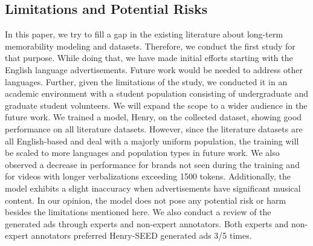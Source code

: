 \subsection{Limitations and Potential Risks}
In this paper, we try to fill a gap in the existing literature about long-term memorability modeling and datasets. Therefore, we conduct the first study for that purpose. While doing that, we have made initial efforts starting with the English language advertisements. Future work would be needed to address other languages. Further, given the limitations of the study, we conducted it in an academic environment with a student population consisting of undergraduate and graduate student volunteers. We will expand the scope to a wider audience in the future work. We trained a model, Henry, on the collected dataset, showing good performance on all literature datasets. However, since the literature datasets are all English-based and deal with a majorly uniform population, the training will be scaled to more languages and population types in future work. We also observed a decrease in performance for brands not seen during the training and for videos with longer verbalizations exceeding 1500 tokens. Additionally, the model exhibits a slight inaccuracy when advertisements have significant musical content. In our opinion, the model does not pose any potential risk or harm besides the limitations mentioned here. We also conduct a review of the generated ads through experts and non-expert annotators. Both experts and non-expert annotators preferred Henry-SEED generated ads 3/5 times.







\FloatBarrier


